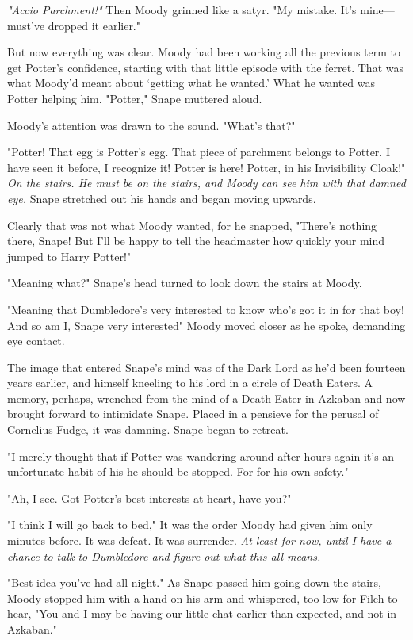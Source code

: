 \emph{"Accio Parchment!"} Then Moody grinned like a satyr. "My mistake. It's mine—must've dropped it earlier."

But now everything was clear. Moody had been working all the previous term to get Potter's confidence, starting with that little episode with the ferret. That was what Moody'd meant about `getting what he wanted.' What he wanted was Potter helping him. "Potter," Snape muttered aloud.

Moody's attention was drawn to the sound. "What's that?"

"Potter! That egg is Potter's egg. That piece of parchment belongs to Potter. I have seen it before, I recognize it! Potter is here! Potter, in his Invisibility Cloak!" \emph{On the stairs. He must be on the stairs, and Moody can see him with that damned eye.} Snape stretched out his hands and began moving upwards.

Clearly that was not what Moody wanted, for he snapped, "There's nothing there, Snape! But I'll be happy to tell the headmaster how quickly your mind jumped to Harry Potter!"

"Meaning what?" Snape's head turned to look down the stairs at Moody.

"Meaning that Dumbledore's very interested to know who's got it in for that boy! And so am I, Snape{\el} very interested{\el}" Moody moved closer as he spoke, demanding eye contact.

The image that entered Snape's mind was of the Dark Lord as he'd been fourteen years earlier, and himself kneeling to his lord in a circle of Death Eaters. A memory, perhaps, wrenched from the mind of a Death Eater in Azkaban and now brought forward to intimidate Snape. Placed in a pensieve for the perusal of Cornelius Fudge, it was damning. Snape began to retreat.

"I merely thought that if Potter was wandering around after hours again{\el} it's an unfortunate habit of his{\el} he should be stopped. For{\el} for his own safety."

"Ah, I see. Got Potter's best interests at heart, have you?"

"I think I will go back to bed," It was the order Moody had given him only minutes before. It was defeat. It was surrender. \emph{At least for now, until I have a chance to talk to Dumbledore and figure out what this all means.}

"Best idea you've had all night." As Snape passed him going down the stairs, Moody stopped him with a hand on his arm and whispered, too low for Filch to hear, "You and I may be having our little chat earlier than expected, and not in Azkaban."

